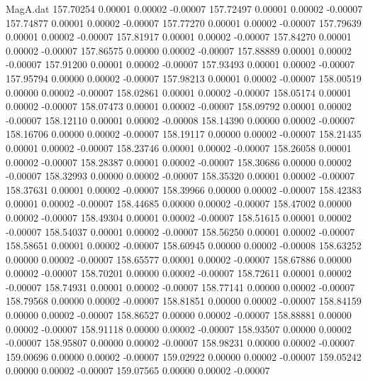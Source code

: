 \begin{filecontents}{MagA.dat}
 157.70254    0.00001    0.00002   -0.00007
 157.72497    0.00001    0.00002   -0.00007
 157.74877    0.00001    0.00002   -0.00007
 157.77270    0.00001    0.00002   -0.00007
 157.79639    0.00001    0.00002   -0.00007
 157.81917    0.00001    0.00002   -0.00007
 157.84270    0.00001    0.00002   -0.00007
 157.86575    0.00000    0.00002   -0.00007
 157.88889    0.00001    0.00002   -0.00007
 157.91200    0.00001    0.00002   -0.00007
 157.93493    0.00001    0.00002   -0.00007
 157.95794    0.00000    0.00002   -0.00007
 157.98213    0.00001    0.00002   -0.00007
 158.00519    0.00000    0.00002   -0.00007
 158.02861    0.00001    0.00002   -0.00007
 158.05174    0.00001    0.00002   -0.00007
 158.07473    0.00001    0.00002   -0.00007
 158.09792    0.00001    0.00002   -0.00007
 158.12110    0.00001    0.00002   -0.00008
 158.14390    0.00000    0.00002   -0.00007
 158.16706    0.00000    0.00002   -0.00007
 158.19117    0.00000    0.00002   -0.00007
 158.21435    0.00001    0.00002   -0.00007
 158.23746    0.00001    0.00002   -0.00007
 158.26058    0.00001    0.00002   -0.00007
 158.28387    0.00001    0.00002   -0.00007
 158.30686    0.00000    0.00002   -0.00007
 158.32993    0.00000    0.00002   -0.00007
 158.35320    0.00001    0.00002   -0.00007
 158.37631    0.00001    0.00002   -0.00007
 158.39966    0.00000    0.00002   -0.00007
 158.42383    0.00001    0.00002   -0.00007
 158.44685    0.00000    0.00002   -0.00007
 158.47002    0.00000    0.00002   -0.00007
 158.49304    0.00001    0.00002   -0.00007
 158.51615    0.00001    0.00002   -0.00007
 158.54037    0.00001    0.00002   -0.00007
 158.56250    0.00001    0.00002   -0.00007
 158.58651    0.00001    0.00002   -0.00007
 158.60945    0.00000    0.00002   -0.00008
 158.63252    0.00000    0.00002   -0.00007
 158.65577    0.00001    0.00002   -0.00007
 158.67886    0.00000    0.00002   -0.00007
 158.70201    0.00000    0.00002   -0.00007
 158.72611    0.00001    0.00002   -0.00007
 158.74931    0.00001    0.00002   -0.00007
 158.77141    0.00000    0.00002   -0.00007
 158.79568    0.00000    0.00002   -0.00007
 158.81851    0.00000    0.00002   -0.00007
 158.84159    0.00000    0.00002   -0.00007
 158.86527    0.00000    0.00002   -0.00007
 158.88881    0.00000    0.00002   -0.00007
 158.91118    0.00000    0.00002   -0.00007
 158.93507    0.00000    0.00002   -0.00007
 158.95807    0.00000    0.00002   -0.00007
 158.98231    0.00000    0.00002   -0.00007
 159.00696    0.00000    0.00002   -0.00007
 159.02922    0.00000    0.00002   -0.00007
 159.05242    0.00000    0.00002   -0.00007
 159.07565    0.00000    0.00002   -0.00007

\end{filecontents}
